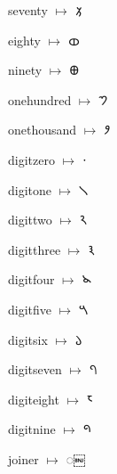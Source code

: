 {\noindent seventy $\mapsto$ {\brfont 𑁡}\par
\noindent eighty $\mapsto$ {\brfont 𑁢}\par
\noindent ninety $\mapsto$ {\brfont 𑁣}\par
\noindent onehundred $\mapsto$ {\brfont 𑁤}\par
\noindent onethousand $\mapsto$ {\brfont 𑁥}\par
\noindent digitzero $\mapsto$ {\brfont 𑁦}\par
\noindent digitone $\mapsto$ {\brfont 𑁧}\par
\noindent digittwo $\mapsto$ {\brfont 𑁨}\par
\noindent digitthree $\mapsto$ {\brfont 𑁩}\par
\noindent digitfour $\mapsto$ {\brfont 𑁪}\par
\noindent digitfive $\mapsto$ {\brfont 𑁫}\par
\noindent digitsix $\mapsto$ {\brfont 𑁬}\par
\noindent digitseven $\mapsto$ {\brfont 𑁭}\par
\noindent digiteight $\mapsto$ {\brfont 𑁮}\par
\noindent digitnine $\mapsto$ {\brfont 𑁯}\par
\noindent joiner $\mapsto$ {\brfont 𑁿}\par
}

